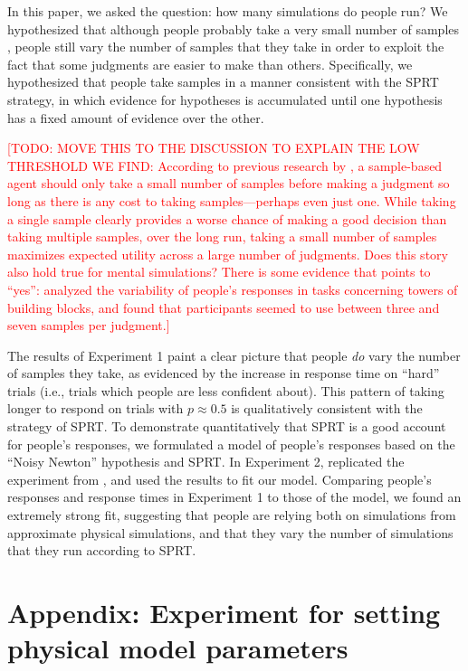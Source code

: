 \documentclass[10pt,letterpaper]{article}
\newcommand{\TODO}[1]{\textcolor{red}{[TODO: #1]}}
\begin{document}
In this paper, we asked the question: how many simulations do people run? We hypothesized that although people probably take a very small number of samples \cite{Vul:2014ba}, people still vary the number of samples that they take in order to exploit the fact that some judgments are easier to make than others. Specifically, we hypothesized that people take samples in a manner consistent with the SPRT strategy, in which evidence for hypotheses is accumulated until one hypothesis has a fixed amount of evidence over the other.

\TODO{MOVE THIS TO THE DISCUSSION TO EXPLAIN THE LOW THRESHOLD WE FIND: According to previous research by \citeA{Vul:2014ba}, a sample-based agent should only take a small number of samples before making a judgment so long as there is any cost to taking samples---perhaps even just one. While taking a single sample clearly provides a worse chance of making a good decision than taking multiple samples, over the long run, taking a small number of samples maximizes expected utility across a large number of judgments. Does this story also hold true for mental simulations? There is some evidence that points to ``yes'': \citeA{Battaglia2013} analyzed the variability of people's responses in tasks concerning towers of building blocks, and found that participants seemed to use between three and seven samples per judgment.}

The results of Experiment 1 paint a clear picture that people \emph{do} vary the number of samples they take, as evidenced by the increase in response time on ``hard'' trials (i.e., trials which people are less confident about). This pattern of taking longer to respond on trials with $p\approx 0.5$ is qualitatively consistent with the strategy of SPRT. To demonstrate quantitatively that SPRT is a good account for people's responses, we formulated a model of people's responses based on the ``Noisy Newton'' hypothesis and SPRT. In Experiment 2, replicated the experiment from , and used the results to fit our model. Comparing people's responses and response times in Experiment 1 to those of the model, we found an extremely strong fit, suggesting that people are relying both on simulations from approximate physical simulations, and that they vary the number of simulations that they run according to SPRT.

\section{Appendix: Experiment for setting physical model parameters}
\end{document}
